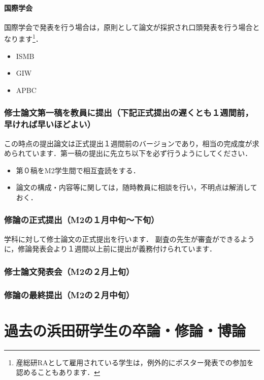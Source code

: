 \documentclass[dvipdfmx,autodetect-engine]{jsreport}
\begin{document}
\subsubsection{国際学会}

国際学会で発表を行う場合は，原則として論文が採択され口頭発表を行う場合となります\footnote{産総研RAとして雇用されている学生は，例外的にポスター発表での参加を認めることもあります．}．

\begin{itemize}
\item ISMB
\item GIW
\item APBC
\end{itemize}

\subsection{修士論文第一稿を教員に提出（下記正式提出の遅くとも１週間前，早ければ早いほどよい）}

この時点の提出論文は正式提出１週間前のバージョンであり，相当の完成度が求められています．第一稿の提出に先立ち以下を必ず行うようにしてください．

\begin{itemize}
\item 第０稿をM2学生間で相互査読をする．
\item 論文の構成・内容等に関しては，随時教員に相談を行い，不明点は解消しておく．
\end{itemize}


\subsection{修論の正式提出（M2の１月中旬〜下旬）}

学科に対して修士論文の正式提出を行います．
副査の先生が審査ができるように，修論発表会より１週間以上前に提出が義務付けられています．


\subsection{修士論文発表会（M2の２月上旬）}

\subsection{修論の最終提出（M2の２月中旬）}

\chapter{過去の浜田研学生の卒論・修論・博論}\label{chap:past_thesis}
\end{document}

